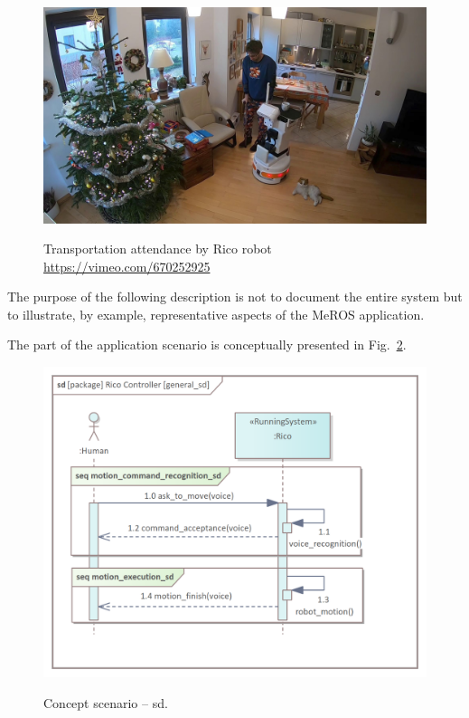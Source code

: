 \documentclass[11pt,oneside,a4paper]{article}
\begin{document}
	\begin{figure}[H]
		\centering
		\begin{center}
			{\includegraphics[width=0.9\columnwidth]{img/herbatka_u_winiara.jpg}}
		\end{center}
		\caption{Transportation attendance by Rico robot \url{https://vimeo.com/670252925}} 
		\label{fig:herbatka_u_winiara}
	\end{figure}
	
	
	
	 The purpose of the following description is not to document the entire system but to illustrate, by example, representative aspects of the MeROS application.
	 
	 \pagebreak
	 
	The part of the application scenario is conceptually presented in Fig.~\ref{fig:general_sd}.
	

	\begin{figure}[H] 
		\centering
		\begin{center}
			{\includegraphics[scale=0.95]{img/rico_pkg/general_sd.png}}
		\end{center}
		\caption{Concept scenario -- sd.} 
		\label{fig:general_sd}
	\end{figure}
	
\end{document}
